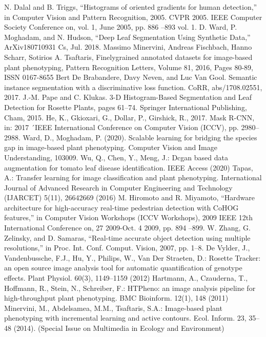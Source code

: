 \documentclass[conference]{IEEEtran}
\begin{document}
\begin{thebibliography}{00}

 N. Dalal and B. Triggs, “Histograms of oriented gradients for human detection,” in Computer Vision and Pattern Recognition, 2005. CVPR 2005. IEEE Computer Society Conference on, vol. 1, June 2005, pp. 886 –893 vol. 1.
 D. Ward, P. Moghadam, and N. Hudson, “Deep Leaf Segmentation Using
Synthetic Data,” ArXiv180710931 Cs, Jul. 2018.
 Massimo Minervini, Andreas Fischbach, Hanno Scharr, Sotirios A. Tsaftaris, Finelygrained annotated datasets for image-based plant phenotyping, Pattern Recognition Letters, Volume 81, 2016, Pages 80-89, ISSN 0167-8655
 Bert De Brabandere, Davy Neven, and Luc Van Gool. Semantic instance segmentation with a discriminative loss function. CoRR, abs/1708.02551, 2017.
 J.-M. Pape and C. Klukas. 3-D Histogram-Based Segmentation and Leaf Detection for Rosette Plants, pages 61–74. Springer International Publishing, Cham, 2015.
 He, K., Gkioxari, G., Dollar, P., Girshick, R., 2017. Mask R-CNN, in: 2017 ´IEEE International Conference on Computer Vision (ICCV), pp. 2980–2988.
 Ward, D., Moghadam, P. (2020). Scalable learning for bridging the species gap in image-based plant phenotyping. Computer Vision and Image Understanding, 103009.
 Wu, Q., Chen, Y., Meng, J.: Dcgan based data augmentation for tomato leaf disease identification. IEEE Access (2020)
 Tapas, A.: Transfer learning for image classification and plant phenotyping. International Journal of Advanced Research in Computer Engineering and Technology (IJARCET) 5(11), 26642669 (2016)
 M. Hiromoto and R. Miyamoto, “Hardware architecture for high-accuracy real-time pedestrian detection with CoHOG features,” in Computer Vision Workshops (ICCV Workshops), 2009 IEEE 12th International Conference on, 27 2009-Oct. 4 2009, pp. 894 –899.
 W. Zhang, G. Zelinsky, and D. Samaras, “Real-time accurate object detection using multiple resolutions,” in Proc. Int. Conf. Comput. Vision, 2007, pp. 1–8.
 De Vylder, J., Vandenbussche, F.J., Hu, Y., Philips, W., Van Der Straeten, D.: Rosette Tracker: an open source image analysis tool for automatic quantification of genotype effects. Plant Physiol. 60(3), 1149–1159 (2012)
 Hartmann, A., Czauderna, T., Hoffmann, R., Stein, N., Schreiber, F.: HTPheno: an image analysis pipeline for high-throughput plant phenotyping. BMC Bioinform. 12(1), 148 (2011)
  Minervini, M., Abdelsamea, M.M., Tsaftaris, S.A.: Image-based plant phenotyping with incremental learning and active contours. Ecol. Inform. 23, 35–48 (2014). (Special Issue on Multimedia in Ecology and Environment)

\end{thebibliography}
\end{document}
